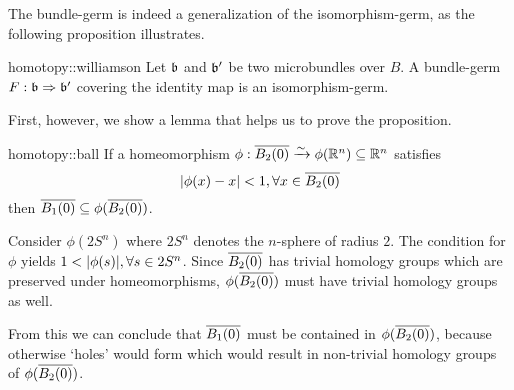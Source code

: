 \begin{myparagraph}
    The bundle-germ is indeed a generalization of the isomorphism-germ, as the following proposition illustrates.
\end{myparagraph}

\begin{myproposition}[Williamson]{homotopy::williamson}
    Let $\mathfrak{b}$ and $\mathfrak{b}'$ be two microbundles over $B$.
    A bundle-germ $F: \mathfrak{b} \Rightarrow{} \mathfrak{b}'$ covering the identity map is an isomorphism-germ.
\end{myproposition}

\begin{myparagraph}
    First, however, we show a lemma that helps us to prove the proposition.
\end{myparagraph}

\begin{mylemma}{homotopy::ball}
    If a homeomorphism $\phi: \clball[2] \isomto \phi(\R^n) \sub \R^n$ satisfies
    \[ \abs{\phi(x) - x} < 1, \forall x \in \clball[2] \]
    then $\clball[1] \sub \phi(\clball[2])$.
\end{mylemma}

\begin{myproof}
    Consider $\phi(2S^n)$ where $2S^n$ denotes the $n$-sphere of radius $2$.
    The condition for $\phi$ yields $1 < \vert{} \phi(s) \vert{}, \forall s \in 2S^n$.
    Since $\clball[2]$ has trivial homology groups which are preserved under homeomorphisms,
    $\phi(\clball[2])$ must have trivial homology groups as well.

    From this we can conclude that $\clball[1]$ must be contained in $\phi(\clball[2])$,
    because otherwise `holes' would form which would result in non-trivial homology groups of $\phi(\clball[2])$.
\end{myproof}

